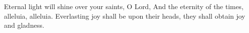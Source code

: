 Eternal light will shine over your saints, O Lord,
\versseparator
And the eternity of the times, alleluia, alleluia.
\versseparator
Everlasting joy shall be upon their heads, they shall obtain joy and gladness.
